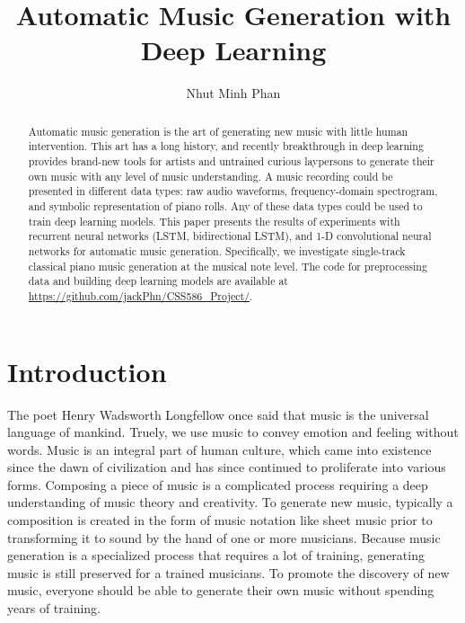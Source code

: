 \documentclass[sigconf,authorversion]{acmart}
\begin{document}
\renewcommand\footnotetextcopyrightpermission[1]{}
\pagestyle{plain}
\title{Automatic Music Generation with Deep Learning}

\author{Nhut Minh Phan}

\begin{abstract}
Automatic music generation is the art of generating new music with little human 
intervention. This art has a long history, and recently breakthrough in deep learning
provides brand-new tools for artists and untrained curious laypersons to generate
their own music with any level of music understanding. A music recording could be 
presented in different data types: raw audio waveforms, frequency-domain spectrogram, 
and symbolic representation of piano rolls. Any of these data types could be used 
to train deep learning models. This paper presents the results of experiments with 
recurrent neural networks (LSTM, bidirectional LSTM), and 1-D convolutional neural 
networks for automatic music generation. Specifically, we investigate single-track 
classical piano music generation at the musical note level. The code for preprocessing 
data and building deep learning models are available at 
\url{https://github.com/jackPhn/CSS586_Project/}.
\end{abstract}


\maketitle

\section{Introduction}

The poet Henry Wadsworth Longfellow once said that music is the universal 
language of mankind. Truely, we use music to convey emotion and feeling without
words. Music is an integral part of human culture, which
came into existence since the dawn of civilization and has since continued to 
proliferate into various forms. Composing a piece of music is a complicated process 
requiring a deep understanding of music theory and creativity. To 
generate new music, typically a composition is created in the form of music notation 
like sheet music prior to transforming it to sound by the hand of one or more musicians.
Because music generation is a specialized process that requires a lot of training,
generating music is still preserved for a trained musicians. To promote the discovery of 
new music, everyone should be able to generate their own music without spending
years of training. 
\end{document}
